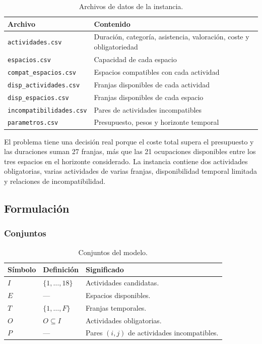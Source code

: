 \begin{table}[htbp]
\centering
\begin{tabular}{p{}p{}}
\toprule
Archivo & Contenido \\
\midrule
\texttt{actividades.csv} & Duración, categoría, asistencia, valoración,
coste y obligatoriedad \\
\texttt{espacios.csv} & Capacidad de cada espacio \\
\texttt{compat\_espacios.csv} & Espacios compatibles con cada actividad \\
\texttt{disp\_actividades.csv} & Franjas disponibles de cada actividad \\
\texttt{disp\_espacios.csv} & Franjas disponibles de cada espacio \\
\texttt{incompatibilidades.csv} & Pares de actividades incompatibles \\
\texttt{parametros.csv} & Presupuesto, pesos y horizonte temporal \\
\bottomrule
\end{tabular}
\caption{Archivos de datos de la instancia.}
\end{table}

El problema tiene una decisión real porque el coste total supera el presupuesto
y las duraciones suman 27 franjas, más que las 21 ocupaciones disponibles entre
los tres espacios en el horizonte considerado. La instancia contiene dos
actividades obligatorias, varias actividades de varias franjas, disponibilidad
temporal limitada y relaciones de incompatibilidad.

\subsection{Formulación}
\subsubsection{Conjuntos}
\begin{table}[H]
\centering
\begin{tabular}{p{}p{}p{}}
\toprule
\textbf{Símbolo} & \textbf{Definición} & \textbf{Significado} \\
\midrule
$I$ & $\{1,\ldots,18\}$ & Actividades candidatas. \\
$E$ & --- & Espacios disponibles. \\
$T$ & $\{1,\ldots,F\}$ & Franjas temporales. \\
$O$ & $O\subseteq I$ & Actividades obligatorias. \\
$P$ & --- & Pares $(i,j)$ de actividades incompatibles. \\
\bottomrule
\end{tabular}
\caption{Conjuntos del modelo.}
\end{table}

